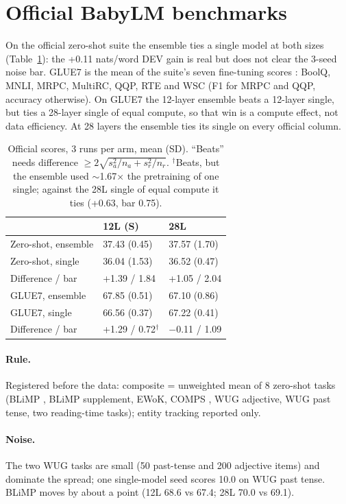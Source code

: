 \documentclass[11pt]{article}
\begin{document}
\section{Official BabyLM benchmarks}
\label{sec:official}
On the official zero-shot suite the ensemble ties a single model at both sizes (Table~\ref{tab:official}): the +0.11
nats/word DEV gain is real but does not clear the 3-seed noise bar. GLUE7 is the mean of the suite's seven
fine-tuning scores \citep{babylm2025}: BoolQ, MNLI, MRPC, MultiRC, QQP, RTE and WSC (F1 for MRPC and QQP, accuracy
otherwise). On GLUE7 the 12-layer ensemble beats a 12-layer single, but
ties a 28-layer single of equal compute, so that win is a compute effect, not data efficiency. At 28 layers the
ensemble ties its single on every official column.

\begin{table}[t]
\centering
\small
\begin{tabular}{@{}lll@{}}
\toprule
 & 12L (S) & 28L \\
\midrule
Zero-shot, ensemble & 37.43 (0.45) & 37.57 (1.70) \\
Zero-shot, single & 36.04 (1.53) & 36.52 (0.47) \\
Difference / bar & +1.39 / 1.84 & +1.05 / 2.04 \\
\midrule
GLUE7, ensemble & 67.85 (0.51) & 67.10 (0.86) \\
GLUE7, single & 66.56 (0.37) & 67.22 (0.41) \\
Difference / bar & +1.29 / 0.72$^\dagger$ & $-$0.11 / 1.09 \\
\bottomrule
\end{tabular}
\caption{Official scores, 3 runs per arm, mean (SD). ``Beats'' needs difference $\geq 2\sqrt{s_a^2/n_a + s_r^2/n_r}$.
$^\dagger$Beats, but the ensemble used $\sim$1.67$\times$ the pretraining of one single; against the 28L single
of equal compute it ties (+0.63, bar 0.75).}
\label{tab:official}
\end{table}

\paragraph{Rule.} Registered before the data: composite = unweighted mean of 8 zero-shot tasks (BLiMP
\citep{warstadt2020blimp}, BLiMP supplement, EWoK, COMPS \citep{misra2023comps}, WUG adjective, WUG past tense, two
reading-time tasks); entity tracking reported only.

\paragraph{Noise.} The two WUG tasks are small (50 past-tense and 200 adjective items) and dominate the spread; one
single-model seed scores 10.0 on WUG past tense. BLiMP moves by about a point (12L 68.6 vs 67.4; 28L 70.0 vs 69.1).
\end{document}
